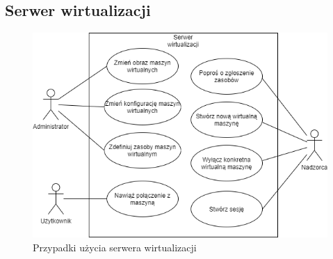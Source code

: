 \documentclass[../wstep.tex]{subfiles}
\begin{document}
\subsection{Serwer wirtualizacji}

\begin{figure}[H]
  \centering
  \includegraphics[width=\textwidth]{../diagrams/use_cases/virtualisation_server.png}
  \caption{Przypadki użycia serwera wirtualizacji}
\end{figure}
\end{document}

